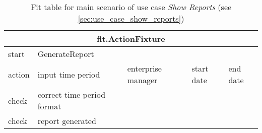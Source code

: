 \begin{table}[H]
\begin{centering}
\begin{tabular}{|l|l|l|l|l|}

\hline  \multicolumn{5}{|c|}{fit.ActionFixture} \\
\hline start & GenerateReport &  \multicolumn{3}{|c|}{ }  \\ 
\hline action & input time period & enterprise manager  & start date  & end date \\ 
\hline check & correct time period format  &  \multicolumn{3}{|c|}{ }\\ 
\hline check & report generated  &  \multicolumn{3}{|c|}{ }   \\ 
\hline 
\end{tabular}

\caption{Fit table for main scenario of use case \emph{Show Reports} (see \autoref{sec:use_case_show_reports})}
 
\par
\end{centering}
\end{table}

